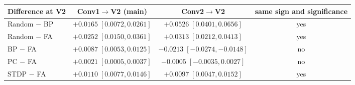 \begin{tabular}{lccc}
\toprule
Difference at V2 & Conv1$\to$V2 (main) & Conv2$\to$V2 & same sign and significance \\
\midrule
Random $-$ BP & $+0.0165\;[0.0072,0.0261]$ & $+0.0526\;[0.0401,0.0656]$ & yes \\
Random $-$ FA & $+0.0252\;[0.0150,0.0361]$ & $+0.0313\;[0.0212,0.0413]$ & yes \\
BP $-$ FA & $+0.0087\;[0.0053,0.0125]$ & $-0.0213\;[-0.0274,-0.0148]$ & no \\
PC $-$ FA & $+0.0021\;[0.0005,0.0037]$ & $-0.0005\;[-0.0035,0.0027]$ & no \\
STDP $-$ FA & $+0.0110\;[0.0077,0.0146]$ & $+0.0097\;[0.0047,0.0152]$ & yes \\
\bottomrule
\end{tabular}
